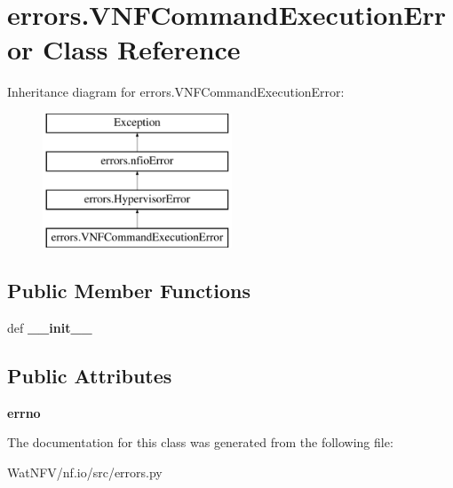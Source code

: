 \hypertarget{classerrors_1_1VNFCommandExecutionError}{\section{errors.\-V\-N\-F\-Command\-Execution\-Error Class Reference}
\label{classerrors_1_1VNFCommandExecutionError}
}
Inheritance diagram for errors.\-V\-N\-F\-Command\-Execution\-Error\-:\begin{figure}[H]
\begin{center}
\leavevmode
\includegraphics[height=4.000000cm]{classerrors_1_1VNFCommandExecutionError}
\end{center}
\end{figure}
\subsection*{Public Member Functions}
\begin{DoxyCompactItemize}
\item 
\hypertarget{classerrors_1_1VNFCommandExecutionError_af0c11e6123bad9731ea4a2f26a355386}{def {\bfseries \-\_\-\-\_\-init\-\_\-\-\_\-}}\label{classerrors_1_1VNFCommandExecutionError_af0c11e6123bad9731ea4a2f26a355386}

\end{DoxyCompactItemize}
\subsection*{Public Attributes}
\begin{DoxyCompactItemize}
\item 
\hypertarget{classerrors_1_1VNFCommandExecutionError_aaa61a3add5b9a67e6e6076b30d58d2ad}{{\bfseries errno}}\label{classerrors_1_1VNFCommandExecutionError_aaa61a3add5b9a67e6e6076b30d58d2ad}

\end{DoxyCompactItemize}


The documentation for this class was generated from the following file\-:\begin{DoxyCompactItemize}
\item 
Wat\-N\-F\-V/nf.\-io/src/errors.\-py\end{DoxyCompactItemize}
